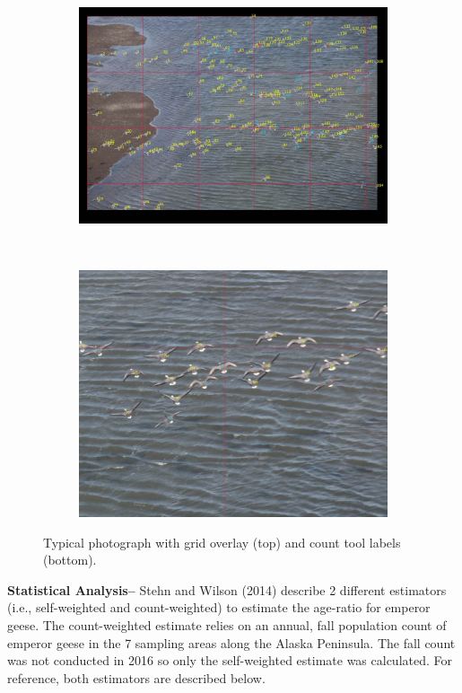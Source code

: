 \documentclass[]{article}
\begin{document}
\begin{figure}
\centering
\begin{subfigure}[h]{0.9\textwidth}
\includegraphics[width=1\linewidth]{figure3a.jpg}
\end{subfigure}
\\
\begin{subfigure}[h]{0.9\textwidth}
\includegraphics[width=1\linewidth]{figure3b.jpg}
\end{subfigure}
\caption{Typical photograph with grid overlay (top) and count tool labels (bottom).}
\end{figure}

\textbf{Statistical Analysis--} Stehn and Wilson (2014) describe 2
different estimators (i.e., self-weighted and count-weighted) to
estimate the age-ratio for emperor geese. The count-weighted estimate
relies on an annual, fall population count of emperor geese in the 7
sampling areas along the Alaska Peninsula. The fall count was not
conducted in 2016 so only the self-weighted estimate was calculated. For
reference, both estimators are described below.
\end{document}
